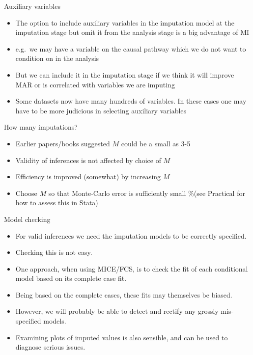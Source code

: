 \documentclass[ignorenonframetext,]{beamer}
\providecommand{\tightlist}{%
  \setlength{\itemsep}{0pt}\setlength{\parskip}{0pt}}
\begin{document}
\begin{frame}{Auxiliary variables}
\protect\hypertarget{auxiliary-variables-1}{}

\begin{itemize}
\tightlist
\item
  The option to include auxiliary variables in the imputation model at
  the imputation stage but omit it from the analysis stage is a big
  advantage of MI
\item
  e.g.~we may have a variable on the causal pathway which we do not want
  to condition on in the analysis
\item
  But we can include it in the imputation stage if we think it will
  improve MAR or is correlated with variables we are imputing
\item
  Some datasets now have many hundreds of variables. In these cases one
  may have to be more judicious in selecting auxiliary variables
\end{itemize}

\end{frame}

\begin{frame}{How many imputations?}
\protect\hypertarget{how-many-imputations}{}

\begin{itemize}
\tightlist
\item
  Earlier papers/books suggested \(M\) could be a small as 3-5
\item
  Validity of inferences is not affected by choice of \(M\)
\item
  Efficiency is improved (somewhat) by increasing \(M\)
\item
  Choose \(M\) so that Monte-Carlo error is sufficiently small \%(see
  Practical for how to assess this in Stata)
\end{itemize}

\end{frame}

\begin{frame}{Model checking}
\protect\hypertarget{model-checking}{}

\begin{itemize}
\tightlist
\item
  For valid inferences we need the imputation models to be correctly
  specified.
\item
  Checking this is not easy.
\item
  One approach, when using MICE/FCS, is to check the fit of each
  conditional model based on its complete case fit.
\item
  Being based on the complete cases, these fits may themselves be
  biased.
\item
  However, we will probably be able to detect and rectify any grossly
  mis-specified models.
\item
  Examining plots of imputed values is also sensible, and can be used to
  diagnose serious issues.
\end{itemize}

\end{frame}
\end{document}
